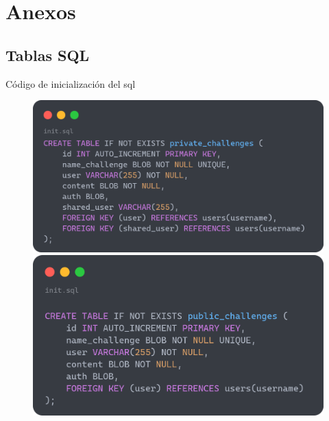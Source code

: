 \documentclass[a4paper,11pt]{article}
\begin{document}
\newpage
\section{Anexos}
\centering
\subsection{Tablas SQL}
    \label{sec:TablasSQL}
    Código de inicialización del sql
    \begin{figure}[htbp]
        \centering
        \begin{minipage}[t]{0.48\textwidth} %
            \centering
            \includegraphics[width=\textwidth]{images/privateChallenge.png}
        \end{minipage}
        \hfill
        \begin{minipage}[t]{0.48\textwidth} %
            \centering
            \includegraphics[width=\textwidth]{images/publicChallenge.png}
        \end{minipage}

\end{figure}
\end{document}
